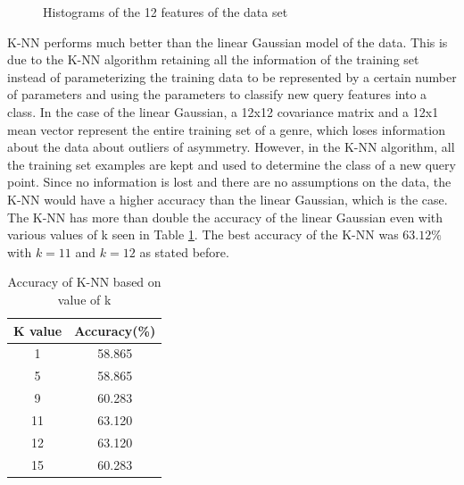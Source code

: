 \documentclass[11pt]{scrartcl}
\begin{document}
\begin{figure}[ht]
\caption{Histograms of the 12 features of the data set}
\label{fig:F14}
\end{figure}

K-NN performs much better than the linear Gaussian model of the data. This is due to the K-NN algorithm retaining all the information of the training set instead of parameterizing the training data to be represented by a certain number of parameters and using the parameters to  classify new query features into a class. In the case of the linear Gaussian, a 12x12 covariance matrix and a 12x1 mean vector represent the entire training set of a genre, which loses information about the data about outliers of asymmetry. However, in the K-NN algorithm, all the training set examples are kept and used to determine the class of a new query point. Since no information is lost and there are no assumptions on the data, the K-NN would have a higher accuracy than the linear Gaussian, which is the case. The K-NN has more than double the accuracy of the linear Gaussian even with various values of k seen in Table \ref{table:T0}. The best accuracy of the K-NN was $63.12\%$ with $k=11$ and $k=12$ as stated before. 

\begin{table}[ht]
\centering
 \begin{tabular}{||c c||} 
 \hline
 K value & Accuracy(\%) \\ [0.5ex] 
 \hline\hline
 1 & 58.865 \\ 
 \hline
 5 & 58.865 \\
 \hline
 9 & 60.283 \\
 \hline
 11 & 63.120 \\
 \hline
 12 & 63.120 \\
 \hline
 15 & 60.283 \\ [1ex] 
 \hline
\end{tabular}
\caption{Accuracy of K-NN based on value of k}
\label{table:T0}
\end{table} 
\end{document}
